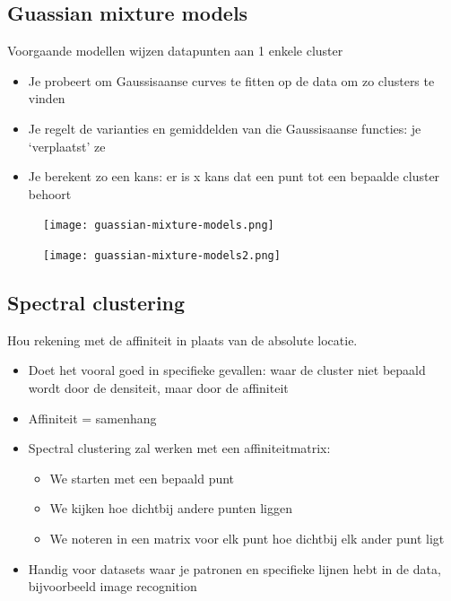 \documentclass{article}
\begin{document}
\subsection{Guassian mixture models}

Voorgaande modellen wijzen datapunten aan 1 enkele cluster

\begin{itemize}
    \item Je probeert om Gaussisaanse curves te fitten op de data om zo clusters te vinden
    \item Je regelt de varianties en gemiddelden van die Gaussisaanse functies: je `verplaatst' ze
    \item Je berekent zo een kans: er is x kans dat een punt tot een bepaalde cluster behoort 
\end{itemize}

\begin{figure}[H]
    \centering
    \texttt{[image: guassian-mixture-models.png]}
\end{figure}

\begin{figure}[H]
    \centering
    \texttt{[image: guassian-mixture-models2.png]}
\end{figure}

\subsection{Spectral clustering}

Hou rekening met de affiniteit in plaats van de absolute locatie.

\begin{itemize}
    \item Doet het vooral goed in specifieke gevallen: waar de cluster niet bepaald wordt door de densiteit, maar door de affiniteit
    \item Affiniteit = samenhang
    \item Spectral clustering zal werken met een affiniteitmatrix:
    \begin{itemize}
        \item We starten met een bepaald punt
        \item We kijken hoe dichtbij andere punten liggen
        \item We noteren in een matrix voor elk punt hoe dichtbij elk ander punt ligt
    \end{itemize}
    \item Handig voor datasets waar je patronen en specifieke lijnen hebt in de data, bijvoorbeeld image recognition
\end{itemize}
\end{document}
